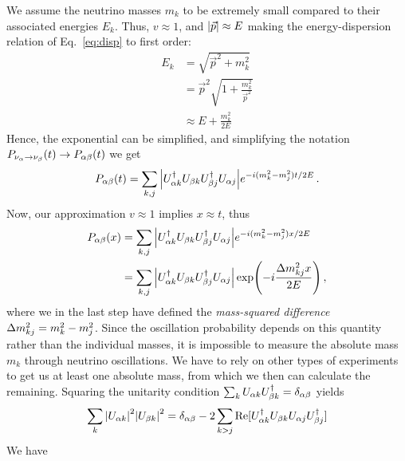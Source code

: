 We assume the neutrino masses $m_k$ to be extremely small compared to their associated energies $E_k$. 
Thus, $v\approx 1$, and $\abs{\vec{p}} \approx E$ making the energy-dispersion relation of Eq.~\ref{eq:disp} to first order:
\begin{align}\label{eq:ultra_rel}
    E_k &= \sqrt{{\vec{p}}^2 + m_k^2} \nonumber \\
        &= {\vec{p}}^2\sqrt{1 + \frac{m_k^2}{\vec{p}^2}} \nonumber \\
        &\approx E + \frac{m_k^2}{2E}
\end{align}
Hence, the exponential can be simplified, and simplifying the notation $P_{\nu_\alpha \to \nu_\beta}(t) \to P_{\alpha\beta}(t)$ we get 
\begin{align}
    P_{\alpha\beta}(t) = \sum_{k,j} \abs{U^\dagger_{\alpha k}U_{\beta k}U^\dagger_{\beta j}U_{\alpha j}} e^{-i(m_k^2-m_j^2)t/2E}\,.
\end{align}
Now, our approximation $v\approx 1$ implies $x\approx t $, thus
\begin{align}
    P_{\ab}(x) &= \sum_{k,j} \abs{U^\dagger_{\a k}U_{\b k}U^\dagger_{\b j}U_{\a j}} e^{-i(m_k^2-m_j^2)x/2E} \nonumber \\
                       &= \sum_{k,j} \abs{U^\dagger_{\a k}U_{\b k}U^\dagger_{\b j}U_{\a j}} \exp(-i\frac{\dm_{kj}x}{2E})\,,
\end{align}
where we in the last step have defined the \emph{mass-squared difference} $\dm_{kj} = m_k^2 - m_j^2$. Since the oscillation probability depends on this quantity
rather than the individual masses, it is impossible to measure the absolute mass $m_k$ through neutrino oscillations. We have
to rely on other types of experiments to get us at least one absolute mass, from which we then can calculate the remaining.
Squaring the unitarity condition $\sum_k U_{\alpha k}U_{\beta k}^\dagger = \delta_{\alpha \beta}$ yields 
\begin{align}
    \sum_k \abs{U_{\alpha k}}^2\abs{U_{\beta k}}^2 = \delta_{\alpha \beta} - 2 \sum_{k>j}\Re[U_{\alpha k}^\dagger U_{\beta k} U_{\alpha j} U_{\beta j}^\dagger]
\end{align}
We have
